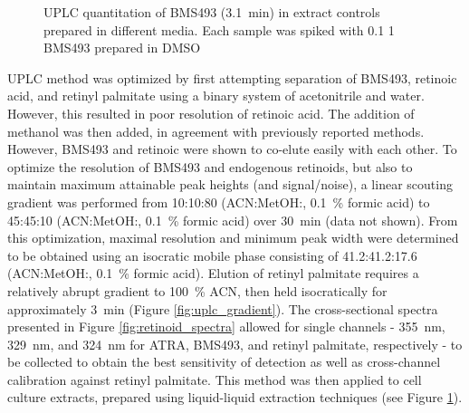 \begin{refsection}
\begin{figure}
\begin{subfigure}[b]{0.8\textwidth}
    \end{subfigure} \caption{UPLC quantitation of BMS493 (\SI{3.1}{\minute}) in
    extract controls prepared in different media. Each sample was spiked with
    \SI{0.1}{\volper} \SI{1}{\milli\moLar} BMS493 prepared in
DMSO}\label{fig:extract_controls} \end{figure}
UPLC method was optimized by first attempting separation of BMS493, retinoic
acid, and retinyl palmitate using a binary system of acetonitrile and water.
However, this resulted in poor resolution of retinoic acid. The addition of
methanol was then added, in agreement with previously reported
methods.\cite{DeLeenheer1982,Kane2008b,Wang2001a,Schaffer2010} However, BMS493
and retinoic were shown to co-elute easily with each other. To optimize the
resolution of BMS493 and endogenous retinoids, but also to maintain maximum
attainable peak heights (and signal/noise), a linear scouting gradient was
performed from 10:10:80 (ACN:MetOH:, \SI{0.1}{\percent} formic acid) to
45:45:10 (ACN:MetOH:, \SI{0.1}{\percent} formic acid) over
\SI{30}{\minute} (data not shown). From this optimization, maximal resolution
and minimum peak width were determined to be obtained using an isocratic mobile
phase consisting of 41.2:41.2:17.6 (ACN:MetOH:, \SI{0.1}{\percent}
formic acid). Elution of retinyl palmitate requires a relatively abrupt gradient
to \SI{100}{\percent} ACN, then held isocratically for approximately
\SI{3}{\minute} (Figure \ref{fig:uplc_gradient}). The cross-sectional spectra
presented in Figure \ref{fig:retinoid_spectra} allowed for single channels -
\SI{355}{\nm}, \SI{329}{\nm}, and \SI{324}{\nm} for ATRA, BMS493, and retinyl
palmitate, respectively - to be collected to obtain the best sensitivity of
detection as well as cross-channel calibration against retinyl palmitate. This
method was then applied to cell culture extracts, prepared using liquid-liquid
extraction techniques (see Figure \ref{fig:extract_controls}).

\printbibliography[heading=subbibliography]

\end{refsection}
